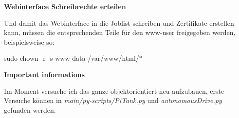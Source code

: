 {\bfseries{Webinterface Schreibrechte erteilen}}

Und damit das Webinterface in die Joblist schreiben und Zertifikate erstellen kann, müssen die entsprechenden Teile für den www-\/user freigegeben werden, beispielsweise so\+:
\begin{DoxyEnumerate}
\item sudo chown -\/r -\/s www-\/data /var/www/html/$\ast$
\end{DoxyEnumerate}

{\bfseries{Important informations}}

Im Moment versuche ich das ganze objektorientiert neu aufzubauen, erste Versuche können in {\itshape main/py-\/scripts/\+Pi\+Tank.\+py} und {\itshape autonomous\+Drive.\+py} gefunden werden. 